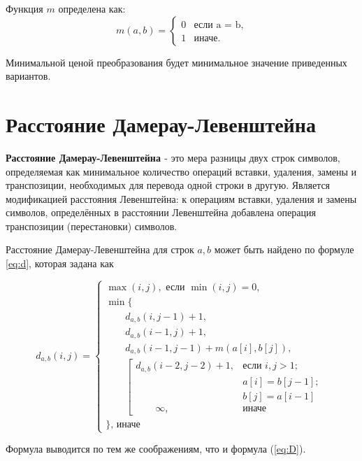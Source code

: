 Функция $m$ определена как:
\begin{equation}
	\label{eq:m}
	m(a, b) = \begin{cases}
		0 &\text{если a = b,}\\
		1 &\text{иначе.}
	\end{cases}
\end{equation}

Минимальной ценой преобразования будет минимальное значение приведенных вариантов.

\section{Расстояние Дамерау-Левенштейна}

\textbf{Расстояние Дамерау-Левенштейна \cite{Dameray_Levenshtein}} - это мера разницы двух строк символов, определяемая как минимальное количество операций вставки, удаления, замены и транспозиции, необходимых для перевода одной строки в другую. Является модификацией расстояния Левенштейна: к операциям вставки, удаления и замены символов, определённых в расстоянии Левенштейна добавлена операция транспозиции (перестановки) символов.

Расстояние Дамерау-Левенштейна для строк $a, b$ может быть найдено по формуле \ref{eq:d}, которая задана как

\begin{equation}
	\label{eq:d}
	d_{a,b}(i, j) = \begin{cases}
		\max(i, j), \text{ если }\min(i, j) = 0,\\
		\min \lbrace \\
		\qquad d_{a,b}(i, j-1) + 1,\\
		\qquad d_{a,b}(i-1, j) + 1,\\
		\qquad d_{a,b}(i-1, j-1) + m(a[i], b[j]),\\
		\qquad \left[ \begin{array}{cc}d_{a,b}(i-2, j-2) + 1, &\text{если }i,j > 1;\\
			\qquad &\text{}a[i] = b[j-1]; \\
			\qquad &\text{}b[j] = a[i-1]\\
			\qquad \infty, & \text{иначе}\end{array}\right.\\
		\rbrace\text{, иначе}
	\end{cases}
\end{equation}

Формула выводится по тем же соображениям, что и формула (\ref{eq:D}).


